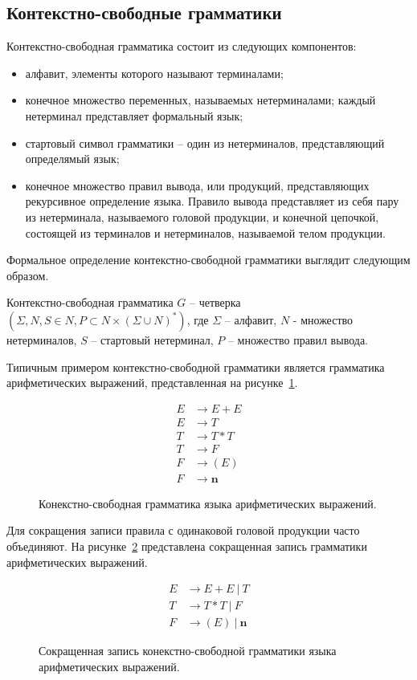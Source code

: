 \subsection{Контекстно-свободные грамматики}
Контекстно-свободная грамматика состоит из следующих компонентов:
\begin{itemize}
    \item алфавит, элементы которого называют терминалами;
    \item конечное множество переменных, называемых нетерминалами; каждый нетерминал представляет формальный язык;
    \item стартовый символ грамматики -- один из нетерминалов, представляющий определямый язык;
    \item конечное множество правил вывода, или продукций, представляющих рекурсивное определение языка.
    Правило вывода представляет из себя пару из нетерминала, называемого головой продукции, и конечной цепочкой,
    состоящей из терминалов и нетерминалов, называемой телом продукции.
\end{itemize}
Формальное определение контекстно-свободной грамматики выглядит следующим образом.
\begin{definition}
Контекстно-свободная грамматика $G$ -- четверка $(\Sigma, N, S \in N, P \subset N \times (\Sigma \cup N)^*)$,
где $\Sigma$ -- алфавит, $N$ - множество нетерминалов, $S$ -- стартовый нетерминал, $P$ -- множество правил вывода.
\end{definition}
Типичным примером контекстно-свободной грамматики является грамматика арифметических выражений, представленная на рисунке~\ref{cf-expr}.
\begin{figure}
    \begin{align*}
        E &\rightarrow E + E\\
        E &\rightarrow T\\
        T &\rightarrow T * T\\
        T &\rightarrow F\\
        F &\rightarrow (E)\\
        F &\rightarrow \pmb{n}
    \end{align*}
    \caption{Конекстно-свободная грамматика языка арифметических выражений.}
    \label{cf-expr}
\end{figure}

Для сокращения записи правила с одинаковой головой продукции часто объединяют. На рисунке~\ref{cf-expr-short} представлена сокращенная запись грамматики арифметических выражений.
\begin{figure}
    \begin{align*}
        E &\rightarrow E + E\ |\ T\\
        T &\rightarrow T * T\ |\ F\\
        F &\rightarrow (E)\ |\ \pmb{n}
    \end{align*}
    \caption{Сокращенная запись конекстно-свободной грамматики языка арифметических выражений.}
    \label{cf-expr-short}
\end{figure}
\FloatBarrier
